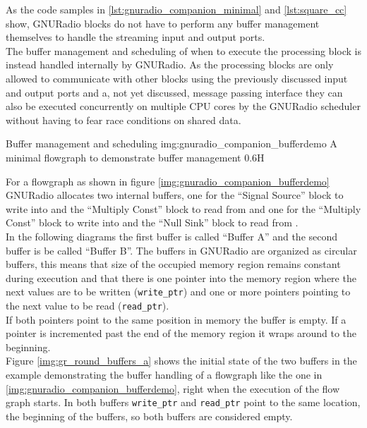As the code samples in \autoref{lst:gnuradio_companion_minimal}
and \autoref{lst:square_cc} show, GNURadio blocks do not have to
perform any buffer management themselves to handle the streaming
input and output ports. \\

The buffer management and scheduling of when to execute the processing
block is instead handled internally by GNURadio.
As the processing blocks are only allowed to communicate with
other blocks using the previously discussed input and output ports
and a, not yet discussed, message passing interface they can also
be executed concurrently on multiple CPU cores by the GNURadio scheduler
without having to fear race conditions on shared data. \\

\begin{subchapter}{Buffer management and scheduling}
               {img:gnuradio_companion_bufferdemo}
               {A minimal flowgraph to demonstrate buffer management}
               {0.6}{H}

  For a flowgraph as shown in figure \ref{img:gnuradio_companion_bufferdemo}
  GNURadio  allocates two internal buffers, one for the ``Signal Source'' block
  to write into and the ``Multiply Const'' block to read from and one for the
  ``Multiply Const'' block to write into and the ``Null Sink'' block to
  read from \cite{grblogbuffers}. \\

  In the following diagrams the first buffer is called ``Buffer A''
  and the second buffer is be called ``Buffer B''.
  The buffers in GNURadio are organized as circular buffers, this means
  that size of the occupied memory region remains constant during execution
  and that there is one pointer into the memory region where the next
  values are to be written (\texttt{write\_ptr}) and one or more
  pointers pointing to the next value to be read (\texttt{read\_ptr}). \\

  If both pointers point to the same position in memory the buffer is empty.
  If a pointer is incremented past the end of the memory region
  it wraps around to the beginning. \\

  Figure \ref{img:gr_round_buffers_a} shows the initial state of the
  two buffers in the example demonstrating the buffer handling
  of a flowgraph like the one in \autoref{img:gnuradio_companion_bufferdemo},
  right when the execution of the flow graph starts.
  In both buffers \texttt{write\_ptr} and \texttt{read\_ptr}
  point to the same location, the beginning of the buffers,
  so both buffers are considered empty.


\end{subchapter}
